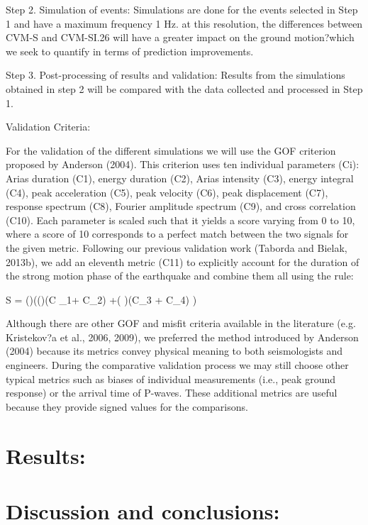 \documentclass[10pt]{article}
\begin{document}
Step 2. Simulation of events: Simulations are done for the events selected in Step 1 and have a maximum frequency 1 Hz. at this resolution, the differences
between CVM-S and CVM-SI.26 will have a greater
impact on the ground motion?which we seek to quantify in
terms of prediction improvements. \par

Step 3. Post-processing of results and  validation:
Results from the simulations obtained in step 2
will be compared with the data collected and processed in
Step 1. \par

Validation Criteria: \par
For the validation of the different simulations we will use the GOF criterion proposed by Anderson (2004).
This criterion uses ten individual parameters (Ci): Arias duration (C1), energy duration (C2), Arias intensity
(C3), energy integral (C4), peak acceleration (C5), peak velocity (C6), peak displacement (C7), response
spectrum (C8), Fourier amplitude spectrum (C9), and cross correlation (C10). Each parameter is scaled
such that it yields a score varying from 0 to 10, where a score of 10 corresponds to a perfect match between
the two signals for the given metric. Following our previous validation work (Taborda and Bielak, 2013b),
we add an eleventh metric (C11) to explicitly account for the duration of the strong motion phase of the
earthquake and combine them all using the rule: \par

S = ()\times(()(C _{1}+ C_{2}) +( )(C_{3} + C_{4}) )

Although there are other GOF and misfit criteria available in the literature (e.g. Kristekov?a et al., 2006,
2009), we preferred the method introduced by Anderson (2004) because its metrics convey physical meaning
to both seismologists and engineers. During the comparative validation process we may still choose other
typical metrics such as biases of individual measurements (i.e., peak ground response) or the arrival time of
P-waves. These additional metrics are useful because they provide signed values for the comparisons.

\section{Results: }

\section{Discussion and conclusions: }
\end{document}
